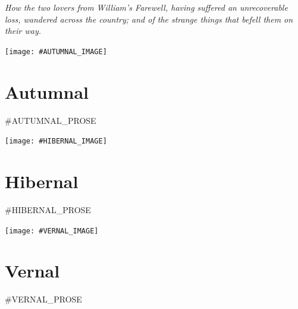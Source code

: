 \documentclass{amsbook}
\begin{document}
\thispagestyle{empty}
\vspace*{\fill}
 {\itshape How the two lovers from \emph{William's Farewell}, having suffered an unrecoverable loss, wandered across the country; and of the strange things that befell them on their way.}
\vspace*{\fill}
\clearpage

\thispagestyle{empty}
\vspace*{\fill}
{\centering
\texttt{[image: \#AUTUMNAL\_IMAGE]}}
\vspace*{\fill}
\clearpage

\mainmatter

\chapter{Autumnal}

\renewcommand{\poemone}{
    #AUTUMNAL_POEM_1
}
\renewcommand{\poemtwo}{
    #AUTUMNAL_POEM_2
}
\renewcommand{\poemthree}{
    #AUTUMNAL_PRAYER
}
\initprintpoems
#AUTUMNAL_PROSE
\clearpage

\thispagestyle{empty}
\vspace*{\fill}
{\centering
\texttt{[image: \#HIBERNAL\_IMAGE]}}
\vspace*{\fill}
\clearpage

\chapter{Hibernal}

\renewcommand{\poemone}{
    #HIBERNAL_POEM_1
}
\renewcommand{\poemtwo}{
    #HIBERNAL_POEM_2
}
\renewcommand{\poemthree}{
    #HIBERNAL_PRAYER
}
\initprintpoems

#HIBERNAL_PROSE
\clearpage

\thispagestyle{empty}
\vspace*{\fill}
{\centering
\texttt{[image: \#VERNAL\_IMAGE]}}
\vspace*{\fill}
\clearpage

\chapter{Vernal}

\renewcommand{\poemone}{
    #VERNAL_POEM_1
}
\renewcommand{\poemtwo}{
    #VERNAL_POEM_2
}
\renewcommand{\poemthree}{
    #VERNAL_PRAYER
}
\initprintpoems

#VERNAL_PROSE
\clearpage
\end{document}
